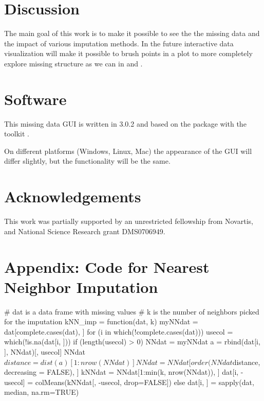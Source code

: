 \documentclass[article]{jss}
\begin{document}
\section{Discussion}

The main goal of this work is to make it possible to see the the missing data and the impact of various imputation methods. In the future interactive data visualization will make it possible to brush points in a plot to more completely explore missing structure as we can in  and .


\section*{Software}

This missing data GUI is written in  3.0.2 \citep{r} and based on the package  \citep{gwidgets} with the toolkit . 

On different platforms (Windows, Linux, Mac) the appearance of the GUI will differ slightly, but the functionality will be the same.

\section*{Acknowledgements}

This work was partially supported by an unrestricted fellowship from Novartis, and National Science Research grant DMS0706949.




\section*{Appendix: Code for Nearest Neighbor Imputation}

\begin{Code}
# dat is a data frame with missing values
# k is the number of neighbors picked for the imputation
kNN_imp = function(dat, k){
  myNNdat = dat[complete.cases(dat), ]
  for (i in which(!complete.cases(dat))) {
    usecol = which(!is.na(dat[i, ]))
    if (length(usecol) > 0) {
      NNdat = myNNdat
      a = rbind(dat[i, ], NNdat)[, usecol]
      NNdat$distance = dist(a)[1:nrow(NNdat)]
      NNdat = NNdat[order(NNdat$distance, decreasing = FALSE), ]
      kNNdat = NNdat[1:min(k, nrow(NNdat)), ]
      dat[i, -usecol] = colMeans(kNNdat[, -usecol, drop=FALSE])
    } else {
      dat[i, ] = sapply(dat, median, na.rm=TRUE)
    }
  }
}
\end{Code}
\end{document}
